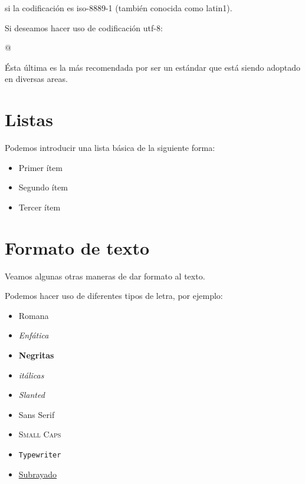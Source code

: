 \documentclass[letterpaper,11pt]{article}
\begin{document}
si la codificación es iso-8889-1 (también conocida como latin1).

Si deseamos hacer uso de codificación utf-8:

\verb@\usepackage[utf8]{inputenc}@

\noindent Ésta última es la más recomendada por ser un estándar que está siendo adoptado en diversas areas.

\section{Listas}

Podemos introducir una lista básica de la siguiente forma:

\begin{itemize}
\item Primer ítem
\item Segundo ítem
\item Tercer ítem
\end{itemize}

\section{Formato de texto}

Veamos algunas otras maneras de dar formato al texto.

Podemos hacer uso de diferentes tipos de letra, por ejemplo:

\begin{itemize}
\item \textrm{Romana}

\item \emph{Enfática}

\item \textbf{Negritas}

\item \textit{itálicas}

\item \textsl{Slanted}

\item \textsf{Sans Serif}

\item \textsc{Small Caps}

\item \texttt{Typewriter}

\item \underline{Subrayado}

\end{itemize}
\end{document}
